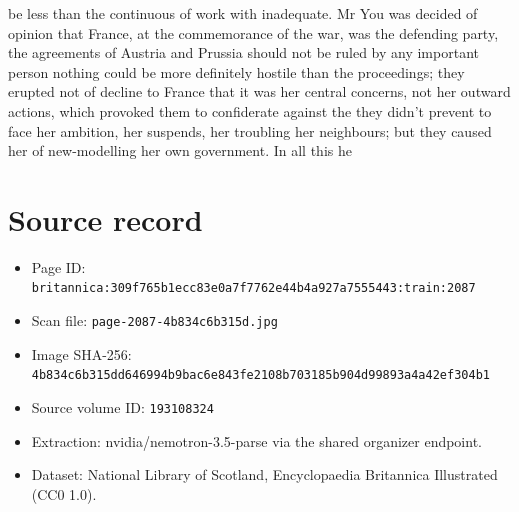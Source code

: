 \documentclass{article}
\begin{document}
be less than the continuous of work with inadequate. Mr You was decided of opinion that France, at the commemorance of the war, was the defending party, the agreements of Austria and Prussia should not be ruled by any important person nothing could be more definitely hostile than the proceedings; they erupted not of decline to France that it was her central concerns, not her outward actions, which provoked them to confiderate against the they didn't prevent to face her ambition, her suspends, her troubling her neighbours; but they caused her of new-modelling her own government. In all this he

\section*{Source record}
\begin{itemize}
\item Page ID: \texttt{britannica:309f765b1ecc83e0a7f7762e44b4a927a7555443:train:2087}
\item Scan file: \texttt{page-2087-4b834c6b315d.jpg}
\item Image SHA-256: \texttt{4b834c6b315dd646994b9bac6e843fe2108b703185b904d99893a4a42ef304b1}
\item Source volume ID: \texttt{193108324}
\item Extraction: nvidia/nemotron-3.5-parse via the shared organizer endpoint.
\item Dataset: National Library of Scotland, Encyclopaedia Britannica Illustrated (CC0 1.0).
\end{itemize}
\end{document}
